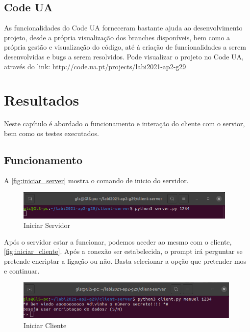 \documentclass{report}
\begin{document}
\section{Code UA}
\label{sec:code_ua}
As funcionalidades do Code UA forneceram bastante ajuda ao desenvolvimento projeto, desde a própria visualização dos branches disponíveis, bem como a própria gestão e visualização do código, até à criação de funcionalidades a serem desenvolvidas e bugs a serem resolvidos. Pode visualizar o projeto no Code UA, através do link: \url{http://code.ua.pt/projects/labi2021-ap2-g29}


\chapter{Resultados}
\label{chap.resultados}

Neste capítulo é abordado o funcionamento e interação do cliente com o servior, bem como os testes executados.

\section{Funcionamento}
\label{sec:funcionamento}

A \autoref{fig:iniciar_server} mostra o comando de inicio do servidor.

\begin{figure}[!h]
\center 
\includegraphics[height=40pt]{img/fotos_resultado/iniciar_server.png}
\caption{Iniciar Servidor}
\label{fig:iniciar_server}
\end{figure}

Após o servidor estar a funcionar, podemos aceder ao mesmo com o cliente,  \autoref{fig:iniciar_cliente}. Após a conexão ser estabelecida, o prompt irá perguntar se pretende encriptar a ligação ou não. Basta selecionar a opção que pretender-mos e continuar.

\begin{figure}[!h]
\center 
\includegraphics[height=55pt]{img/fotos_resultado/iniciar_client.png}
\caption{Iniciar Cliente}
\label{fig:iniciar_cliente}
\end{figure}
\end{document}
